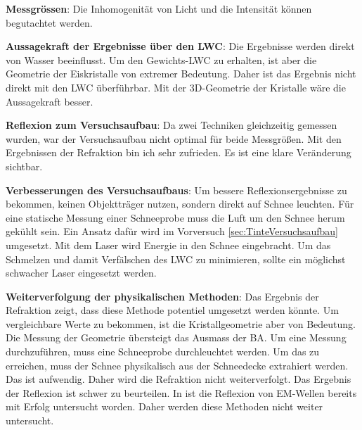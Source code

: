 \textbf{Messgrössen}:
Die Inhomogenität von Licht und die Intensität können begutachtet werden.



\textbf{Aussagekraft der Ergebnisse über den LWC}:
Die Ergebnisse werden direkt von Wasser beeinflusst. Um den Gewichts-LWC zu erhalten, ist aber die Geometrie der Eiskristalle von extremer Bedeutung. Daher ist das Ergebnis nicht direkt mit den LWC überführbar. Mit der 3D-Geometrie der Kristalle wäre die Aussagekraft besser.

\textbf{Reflexion zum Versuchsaufbau}:
Da zwei Techniken gleichzeitig gemessen wurden, war der Versuchsaufbau nicht optimal für beide Messgrößen. Mit den Ergebnissen der Refraktion bin ich sehr zufrieden. Es ist eine klare Veränderung sichtbar.

\textbf{Verbesserungen des Versuchsaufbaus}:
Um bessere Reflexionsergebnisse zu bekommen, keinen Objektträger nutzen, sondern direkt auf Schnee leuchten. Für eine statische Messung einer Schneeprobe muss die Luft um den Schnee herum gekühlt sein. Ein Ansatz dafür wird im Vorversuch \ref{sec:TinteVersuchsaufbau} umgesetzt. Mit dem Laser wird Energie in den Schnee eingebracht. Um das Schmelzen und damit Verfälschen des LWC zu minimieren, sollte ein möglichst schwacher Laser eingesetzt werden.

\textbf{Weiterverfolgung der physikalischen Methoden}:
Das Ergebnis der Refraktion zeigt, dass diese Methode potentiel umgesetzt werden könnte. Um vergleichbare Werte zu bekommen, ist die Kristallgeometrie aber von Bedeutung. Die Messung der Geometrie übersteigt das Ausmass der BA. Um eine Messung durchzuführen, muss eine Schneeprobe durchleuchtet werden. Um das zu erreichen, muss der Schnee physikalisch aus der Schneedecke extrahiert werden. Das ist aufwendig. Daher wird die Refraktion nicht weiterverfolgt. Das Ergebnis der Reflexion ist schwer zu beurteilen. In \cite{Donahue.2022} ist die Reflexion von EM-Wellen bereits mit Erfolg untersucht worden. Daher werden diese Methoden nicht weiter untersucht.
